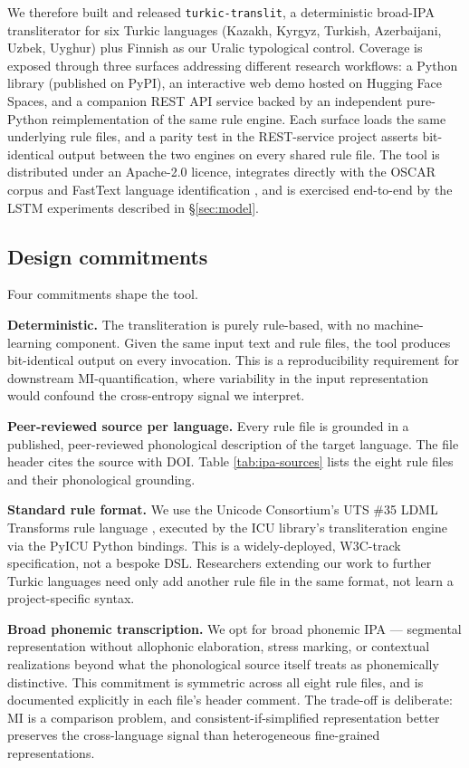 We therefore built and released \texttt{turkic-translit}, a deterministic broad-IPA transliterator for six Turkic languages (Kazakh, Kyrgyz, Turkish, Azerbaijani, Uzbek, Uyghur) plus Finnish as our Uralic typological control. Coverage is exposed through three surfaces addressing different research workflows: a Python library (published on PyPI), an interactive web demo hosted on Hugging Face Spaces, and a companion REST API service backed by an independent pure-Python reimplementation of the same rule engine. Each surface loads the same underlying rule files, and a parity test in the REST-service project asserts bit-identical output between the two engines on every shared rule file. The tool is distributed under an Apache-2.0 licence, integrates directly with the OSCAR corpus \citep{abadji-etal-2022-towards} and FastText language identification \citep{joulin2016bag}, and is exercised end-to-end by the LSTM experiments described in \S\ref{sec:model}.

\subsection{Design commitments}
\label{sec:ipa-design}

Four commitments shape the tool.

\textbf{Deterministic.} The transliteration is purely rule-based, with no machine-learning component. Given the same input text and rule files, the tool produces bit-identical output on every invocation. This is a reproducibility requirement for downstream MI-quantification, where variability in the input representation would confound the cross-entropy signal we interpret.

\textbf{Peer-reviewed source per language.} Every rule file is grounded in a published, peer-reviewed phonological description of the target language. The file header cites the source with DOI. Table \ref{tab:ipa-sources} lists the eight rule files and their phonological grounding.

\textbf{Standard rule format.} We use the Unicode Consortium's UTS \#35 LDML Transforms rule language \citep{unicode-uts35}, executed by the ICU library's transliteration engine via the PyICU Python bindings. This is a widely-deployed, W3C-track specification, not a bespoke DSL. Researchers extending our work to further Turkic languages need only add another rule file in the same format, not learn a project-specific syntax.

\textbf{Broad phonemic transcription.} We opt for broad phonemic IPA — segmental representation without allophonic elaboration, stress marking, or contextual realizations beyond what the phonological source itself treats as phonemically distinctive. This commitment is symmetric across all eight rule files, and is documented explicitly in each file's header comment. The trade-off is deliberate: MI is a comparison problem, and consistent-if-simplified representation better preserves the cross-language signal than heterogeneous fine-grained representations.

